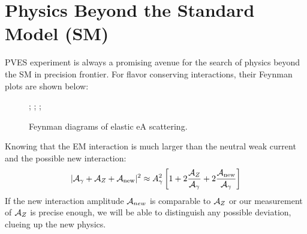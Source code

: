 \section{Physics Beyond the Standard Model (SM)} 
PVES experiment is always a promising avenue for the search
of physics beyond the SM in precision frontier.
For flavor conserving interactions, their Feynman plots are shown below:
\begin{figure}[H]
    \centering
{};
;
;
    \caption{Feynman diagrams of elastic eA scattering.}
\end{figure}

Knowing that the EM interaction is much larger than the neutral weak current and
the possible new interaction:
\begin{equation}
    |\mathcal{A}_\gamma + \mathcal{A}_Z + \mathcal{A}_{\text{new}}|^2 \approx A^2_\gamma\left[ 1 + 2\frac{\mathcal{A}_Z}{\mathcal{A}_\gamma}
    + 2\frac{\mathcal{A}_{\text{new}}}{\mathcal{A}_\gamma} \right]
\end{equation}
If the new interaction amplitude $\mathcal{A}_{new}$ is comparable to $\mathcal{A}_Z$ or our measurement 
of $\mathcal{A}_Z$ is precise enough, we will be able to distinguish any possible deviation,
clueing up the new physics.

